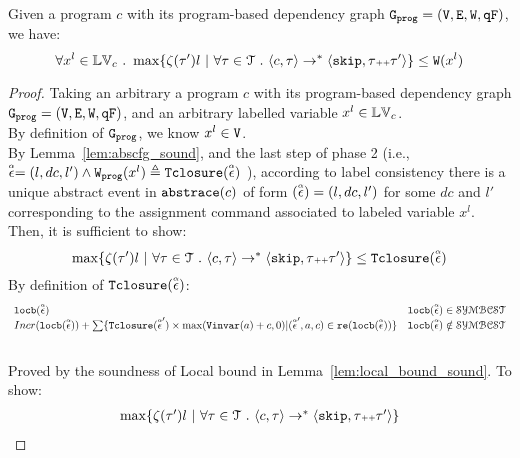 
{
  \begin{thm}
    \label{thm:addweight_soundness}
  Given a program ${c}$ with its program-based dependency graph $\mathtt{{G_{prog}}} = (\mathtt{V}, \mathtt{E}, \mathtt{W}, \mathtt{qF})$, we have:
  \[
  \forall x^l \in \lvar_c \st 
  \max \left\{ \vcounter(\vtrace') l ~ \middle\vert~
  \forall \vtrace \in \mathcal{T} \st \config{{c}, \trace} \to^{*} \config{\eskip, \trace\tracecat\vtrace'} \right\} 
  \leq 
  \weights(x^l)
  \]
  \end{thm}
}
\begin{proof}
  Taking an arbitrary a program ${c}$ with its program-based dependency graph $\mathtt{{G_{prog}}} = (\mathtt{V}, \mathtt{E}, \mathtt{W}, \mathtt{qF})$, 
  and an arbitrary labelled variable $x^l \in \mathbb{LV}_c$.
  \\
  By definition of $\mathtt{{G_{prog}}}$, we know $ x^l \in \mathtt{V}$. 
  \\
  By Lemma~\ref{lem:abscfg_sound}, and the last step of phase 2  (i.e., 
  $
  \stackrel{\scriptscriptstyle{\alpha}}{\mathtt{\epsilon}{}} = (l, dc, l') \land
  \mathtt{{W_{prog}}}(x^l) 
  \triangleq {\ensuremath{\mathtt{Tclosure}}}(\stackrel{\scriptscriptstyle{\alpha}}{\mathtt{\epsilon}{}})
  $
  ), 
    according to label consistency
    there is a unique abstract event in $\mathtt{abs}{\mathtt{trace}}(c)$ of form $(\stackrel{\scriptscriptstyle{\alpha}}{\mathtt{\epsilon}{}}) = (l, dc, l')$ for some $dc$ and $l'$
    corresponding to the assignment command associated to labeled variable 
    $x^l$.
   Then, it is sufficient to show:
  \[
    \max \left\{ \vcounter(\vtrace') l ~ \middle\vert~
  \forall \vtrace \in \mathcal{T} \st \config{{c}, \trace} \to^{*} \config{\eskip, \trace\tracecat\vtrace'} \right\} 
  \leq 
  \absclr(\absevent)
  \]
  By definition of ${\mathtt{Tclosure}}(\stackrel{\scriptscriptstyle{\alpha}}{\mathtt{\epsilon}{}})$:
  \[
 \begin{array}{ll}
  \mathtt{locb}(\stackrel{\scriptscriptstyle{\alpha}}{\mathtt{\epsilon}{}}) & \mathtt{locb}(\stackrel{\scriptscriptstyle{\alpha}}{\mathtt{\epsilon}{}}) \in \mathcal{SYMBCST} \\
  Incr(\mathtt{locb}(\stackrel{\scriptscriptstyle{\alpha}}{\mathtt{\epsilon}{}})) + 
  \sum\{{\mathtt{Tclosure}}(\stackrel{\scriptscriptstyle{\alpha}}{\mathtt{\epsilon}{}}') \times \max({\mathtt{Vinvar}}(a) + c, 0) | (\stackrel{\scriptscriptstyle{\alpha}}{\mathtt{\epsilon}{}}', a, c) \in \mathtt{re}(\mathtt{locb}(\stackrel{\scriptscriptstyle{\alpha}}{\mathtt{\epsilon}{}}))\} 
  & \mathtt{locb}(\stackrel{\scriptscriptstyle{\alpha}}{\mathtt{\epsilon}{}}) \notin \mathcal{SYMBCST}
\end{array}
\]
  \caseL{$\locbound(\absevent) \in \constdom$}
  \\
  Proved by the soundness of Local bound in Lemma~\ref{lem:local_bound_sound}.
  \caseL{$\locbound(\absevent) \notin \constdom$}
To show:
\[
  \begin{array}{l}
    \max \left\{ \vcounter(\vtrace') l ~ \middle\vert~
\forall \vtrace \in \mathcal{T} \st \config{{c}, \trace} \to^{*} \config{\eskip, \trace\tracecat\vtrace'} \right\} 
\\

\end{array}\]
\end{proof}
